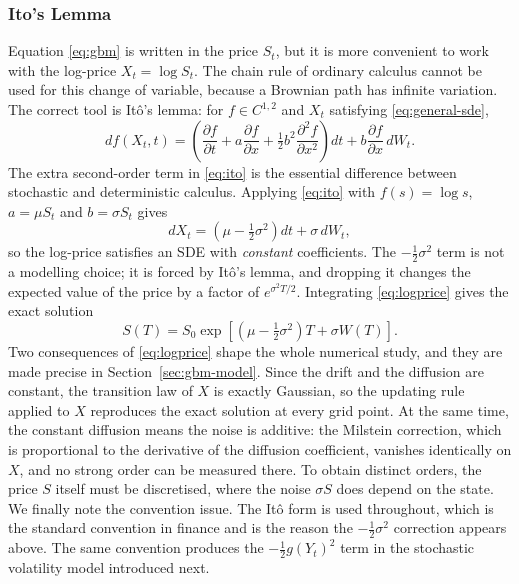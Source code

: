 \documentclass[11pt,a4paper]{article}
\theoremstyle{definition}
\theoremstyle{remark}
\begin{document}
\subsubsection{Ito's Lemma}
\label{sec:ito}
Equation \eqref{eq:gbm} is written in the price $S_t$, but it is more convenient to work with the log-price $X_t = \log S_t$. The chain rule of ordinary calculus cannot be used for this change of variable, because a Brownian path has infinite variation. The correct tool is It\^o's lemma: for $f \in C^{1,2}$ and $X_t$ satisfying \eqref{eq:general-sde},
\begin{equation}
    df(X_t, t) =
    \left( \frac{\partial f}{\partial t}
         + a \frac{\partial f}{\partial x}
         + \tfrac12 b^2 \frac{\partial^2 f}{\partial x^2} \right) dt
    + b \frac{\partial f}{\partial x}\, dW_t .
    \label{eq:ito}
\end{equation}
The extra second-order term in \eqref{eq:ito} is the essential difference between stochastic and deterministic calculus.
Applying \eqref{eq:ito} with $f(s) = \log s$, $a = \mu S_t$ and $b = \sigma S_t$ gives
\begin{equation}
    dX_t = \left( \mu - \tfrac12 \sigma^2 \right) dt + \sigma\, dW_t ,
    \label{eq:logprice}
\end{equation}
so the log-price satisfies an SDE with \emph{constant} coefficients. The $-\tfrac12\sigma^2$ term is not a modelling choice; it is forced by It\^o's lemma, and dropping it changes the expected value of the price by a factor of $e^{\sigma^2 T/2}$. Integrating \eqref{eq:logprice} gives the exact solution
\begin{equation}
    S(T) = S_0 \exp\left[ \left( \mu - \tfrac12 \sigma^2 \right) T + \sigma W(T) \right] .
    \label{eq:gbm-exact}
\end{equation}
Two consequences of \eqref{eq:logprice} shape the whole numerical study, and they are made precise in Section~\ref{sec:gbm-model}. Since the drift and the diffusion are constant, the transition law of $X$ is exactly Gaussian, so the updating rule applied to $X$ reproduces the exact solution at every grid point. At the same time, the constant diffusion means the noise is additive: the Milstein correction, which is proportional to the derivative of the diffusion coefficient, vanishes identically on $X$, and no strong order can be measured there. To obtain distinct orders, the price $S$ itself must be discretised, where the noise $\sigma S$ does depend on the state.
We finally note the convention issue. The It\^o form is used throughout, which is the standard convention in finance and is the reason the $-\tfrac12\sigma^2$ correction appears above. The same convention produces the $-\tfrac12 g(Y_t)^2$ term in the stochastic volatility model introduced next.
\end{document}
